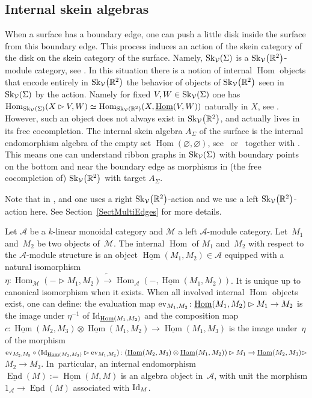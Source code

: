 \documentclass[pdftex]{sigma}%
\numberwithin{equation}{section}
\newcommand{\Hom}{\operatorname{Hom}}
\newcommand{\undHom}{\underline{\operatorname{Hom}}}
\newcommand{\undEnd}{\underline{\operatorname{End}}}
\begin{document}
\subsection{Internal skein algebras}\label{SectASigma}
When a surface has a boundary edge, one can push a little disk inside the surface from this boundary edge. This process induces an action of the skein category of the disk on the skein category of the surface. Namely, ${\rm Sk}_\mathcal{V}(\Sigma)$ is a ${\rm Sk}_\mathcal{V}\big(\mathbb{R}^2\big)$-module category, see \cite[Sections~3.2]{Cooke}. In this situation there is a notion of internal $\Hom$ objects that encode entirely in ${\rm Sk}_\mathcal{V}\big(\mathbb{R}^2\big)$ the behavior of objects of ${\rm Sk}_\mathcal{V}\big(\mathbb{R}^2\big)$ seen in ${\rm Sk}_\mathcal{V}(\Sigma)$ by the action. Namely for fixed $V,W \in {\rm Sk}_\mathcal{V}(\Sigma)$ one has $\Hom_{{\rm Sk}_\mathcal{V}(\Sigma)}(X \rhd V,W) \simeq \Hom_{{\rm Sk}_\mathcal{V}(\mathbb{R}^2)}(X, \underline{\Hom}(V,W))$ naturally in $X$, see \cite[Section~7.9]{EGNO}. However, such an object does not always exist in ${\rm Sk}_\mathcal{V}\big(\mathbb{R}^2\big)$, and actually lives in its free cocompletion. The internal skein algebra $A_\Sigma$ of the surface is the internal endomorphism algebra of the empty set $\underline{\Hom}(\varnothing,\varnothing)$, see~\cite{Gunningham} or~\cite{BBJ} together with \cite{Cooke}. This means one can understand ribbon graphs in ${\rm Sk}_\mathcal{V}(\Sigma)$ with boundary points on the bottom and near the boundary edge as morphisms in (the free cocompletion of) ${\rm Sk}_\mathcal{V}\big(\mathbb{R}^2\big)$ with target $A_\Sigma$.

Note that in \cite{Cooke}, \cite{BBJ} and \cite{Gunningham} one uses a right ${\rm Sk}_\mathcal{V}\big(\mathbb{R}^2\big)$-action and we use a left ${\rm Sk}_\mathcal{V}\big(\mathbb{R}^2\big)$-action here. See Section~\ref{SectMultiEdges} for more details.

\begin{Definition}\label{algStrOnIntHom}
Let $\mathcal{A}$ be a $k$-linear monoidal category and $\mathcal{M}$ a left $\mathcal{A}$-module category. Let~$M_1$ and~$M_2$ be two objects of~$\mathcal{M}$. The internal $\Hom$ of $M_1$ and~$M_2$ with respect to the $\mathcal{A}$-module structure is an object $\undHom(M_1,M_2)\in \mathcal{A}$
equipped with a natural isomorphism $\eta\colon \Hom_\mathcal{M}(-\rhd M_1,M_2) \tilde{\to} \Hom_\mathcal{A}(-,\undHom(M_1,M_2))$. It is unique up to canonical isomorphism when it exists.
When all involved internal $\Hom$ objects exist, one can define: the eva\-lua\-tion map ${\rm ev}_{M_1,M_2}\colon \undHom(M_1,M_2) \rhd M_1\to M_2$ is the image under $\eta^{-1}$ of ${\rm Id}_{\undHom(M_1,M_2)}$ and the composition map $c\colon \undHom(M_2,M_3) \otimes \undHom(M_1,M_2) \to \undHom(M_1,M_3)$ is the image under~$\eta$ of the morphism ${\rm ev}_{M_2,M_3} \circ ({\rm Id}_{\undHom(M_2,M_3)} \rhd {\rm ev}_{M_1,M_2})\colon (\undHom(M_2,M_3) \otimes \undHom(M_1,M_2))\rhd M_1 \to \undHom(M_2,M_3) \rhd$ $M_2\to M_3$.
In~particular, an internal endomorphism $\undEnd(M) := \undHom(M,M)$ is an algebra object in~$\mathcal{A}$, with unit the morphism $1_\mathcal{A} \to \undEnd(M)$ associated with ${\rm Id}_M$.
\end{Definition}
\end{document}
